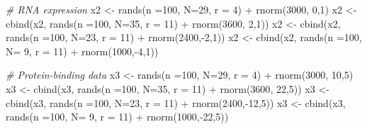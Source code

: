 \documentclass[
]{article}
\newenvironment{Shaded}{\begin{snugshade}}{\end{snugshade}}
\newcommand{\AttributeTok}[1]{\textcolor[rgb]{0.77,0.63,0.00}{#1}}
\newcommand{\CommentTok}[1]{\textcolor[rgb]{0.56,0.35,0.01}{\textit{#1}}}
\newcommand{\DecValTok}[1]{\textcolor[rgb]{0.00,0.00,0.81}{#1}}
\newcommand{\FunctionTok}[1]{\textcolor[rgb]{0.00,0.00,0.00}{#1}}
\newcommand{\NormalTok}[1]{#1}
\newcommand{\OtherTok}[1]{\textcolor[rgb]{0.56,0.35,0.01}{#1}}
\newcommand{\SpecialCharTok}[1]{\textcolor[rgb]{0.00,0.00,0.00}{#1}}
\begin{document}
\begin{Shaded}
\begin{Highlighting}[]
\CommentTok{\# RNA expression}
\NormalTok{x2 }\OtherTok{\textless{}{-}}           \FunctionTok{rands}\NormalTok{(}\AttributeTok{n =}\DecValTok{100}\NormalTok{, }\AttributeTok{N=}\DecValTok{29}\NormalTok{, }\AttributeTok{r =}  \DecValTok{4}\NormalTok{) }\SpecialCharTok{+} \FunctionTok{rnorm}\NormalTok{(}\DecValTok{3000}\NormalTok{, }\DecValTok{0}\NormalTok{,}\DecValTok{1}\NormalTok{)}
\NormalTok{x2 }\OtherTok{\textless{}{-}} \FunctionTok{cbind}\NormalTok{(x2, }\FunctionTok{rands}\NormalTok{(}\AttributeTok{n =}\DecValTok{100}\NormalTok{, }\AttributeTok{N=}\DecValTok{35}\NormalTok{, }\AttributeTok{r =} \DecValTok{11}\NormalTok{) }\SpecialCharTok{+} \FunctionTok{rnorm}\NormalTok{(}\DecValTok{3600}\NormalTok{, }\DecValTok{2}\NormalTok{,}\DecValTok{1}\NormalTok{))}
\NormalTok{x2 }\OtherTok{\textless{}{-}} \FunctionTok{cbind}\NormalTok{(x2, }\FunctionTok{rands}\NormalTok{(}\AttributeTok{n =}\DecValTok{100}\NormalTok{, }\AttributeTok{N=}\DecValTok{23}\NormalTok{, }\AttributeTok{r =} \DecValTok{11}\NormalTok{) }\SpecialCharTok{+} \FunctionTok{rnorm}\NormalTok{(}\DecValTok{2400}\NormalTok{,}\SpecialCharTok{{-}}\DecValTok{2}\NormalTok{,}\DecValTok{1}\NormalTok{))}
\NormalTok{x2 }\OtherTok{\textless{}{-}} \FunctionTok{cbind}\NormalTok{(x2, }\FunctionTok{rands}\NormalTok{(}\AttributeTok{n =}\DecValTok{100}\NormalTok{, }\AttributeTok{N=} \DecValTok{9}\NormalTok{, }\AttributeTok{r =} \DecValTok{11}\NormalTok{) }\SpecialCharTok{+} \FunctionTok{rnorm}\NormalTok{(}\DecValTok{1000}\NormalTok{,}\SpecialCharTok{{-}}\DecValTok{4}\NormalTok{,}\DecValTok{1}\NormalTok{))}

\CommentTok{\# Protein{-}binding data}
\NormalTok{x3 }\OtherTok{\textless{}{-}}           \FunctionTok{rands}\NormalTok{(}\AttributeTok{n =}\DecValTok{100}\NormalTok{, }\AttributeTok{N=}\DecValTok{29}\NormalTok{, }\AttributeTok{r =}  \DecValTok{4}\NormalTok{) }\SpecialCharTok{+} \FunctionTok{rnorm}\NormalTok{(}\DecValTok{3000}\NormalTok{, }\DecValTok{10}\NormalTok{,}\DecValTok{5}\NormalTok{)}
\NormalTok{x3 }\OtherTok{\textless{}{-}} \FunctionTok{cbind}\NormalTok{(x3, }\FunctionTok{rands}\NormalTok{(}\AttributeTok{n =}\DecValTok{100}\NormalTok{, }\AttributeTok{N=}\DecValTok{35}\NormalTok{, }\AttributeTok{r =} \DecValTok{11}\NormalTok{) }\SpecialCharTok{+} \FunctionTok{rnorm}\NormalTok{(}\DecValTok{3600}\NormalTok{, }\DecValTok{22}\NormalTok{,}\DecValTok{5}\NormalTok{))}
\NormalTok{x3 }\OtherTok{\textless{}{-}} \FunctionTok{cbind}\NormalTok{(x3, }\FunctionTok{rands}\NormalTok{(}\AttributeTok{n =}\DecValTok{100}\NormalTok{, }\AttributeTok{N=}\DecValTok{23}\NormalTok{, }\AttributeTok{r =} \DecValTok{11}\NormalTok{) }\SpecialCharTok{+} \FunctionTok{rnorm}\NormalTok{(}\DecValTok{2400}\NormalTok{,}\SpecialCharTok{{-}}\DecValTok{12}\NormalTok{,}\DecValTok{5}\NormalTok{))}
\NormalTok{x3 }\OtherTok{\textless{}{-}} \FunctionTok{cbind}\NormalTok{(x3, }\FunctionTok{rands}\NormalTok{(}\AttributeTok{n =}\DecValTok{100}\NormalTok{, }\AttributeTok{N=} \DecValTok{9}\NormalTok{, }\AttributeTok{r =} \DecValTok{11}\NormalTok{) }\SpecialCharTok{+} \FunctionTok{rnorm}\NormalTok{(}\DecValTok{1000}\NormalTok{,}\SpecialCharTok{{-}}\DecValTok{22}\NormalTok{,}\DecValTok{5}\NormalTok{))}


\end{Highlighting}
\end{Shaded}
\end{document}
